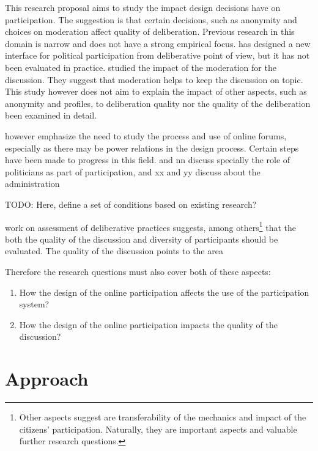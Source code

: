 \documentclass[journal,a4paper]{IEEEtran}
\begin{document}
This research proposal aims to study the impact design decisions have on participation. The suggestion is that certain decisions, such as anonymity and choices on moderation affect quality of deliberation. Previous research in this domain is narrow and does not have a strong empirical focus.  has designed a new interface for political participation from deliberative point of view, but it has not been evaluated in practice.  studied the impact of the moderation for the discussion. They suggest that moderation helps to keep the discussion on topic. This study however does not aim to explain the impact of other aspects, such as anonymity and profiles, to deliberation quality nor the quality of the deliberation been examined in detail.

 however emphasize the need to study the process and use of online forums, especially as there may be power relations in the design process. Certain steps have been made to progress in this field.  and nn discuss specially the role of politicians as part of participation, and xx and yy discuss about the administration

TODO: Here, define a set of conditions based on existing research?

 work on assessment of deliberative practices suggests, among others\footnote{Other aspects  suggest are transferability of the mechanics and impact of the citizens' participation. Naturally, they are important aspects and valuable further research questions.} that the both the quality of the discussion and diversity of participants should be evaluated. The quality of the discussion points to the area

Therefore the research questions must also cover both of these aspects:

\begin{enumerate}
\item How the design of the online participation affects the use of the participation system?
\item How the design of the online participation impacts the quality of the discussion?
\end{enumerate}

\section{Approach}
\end{document}
